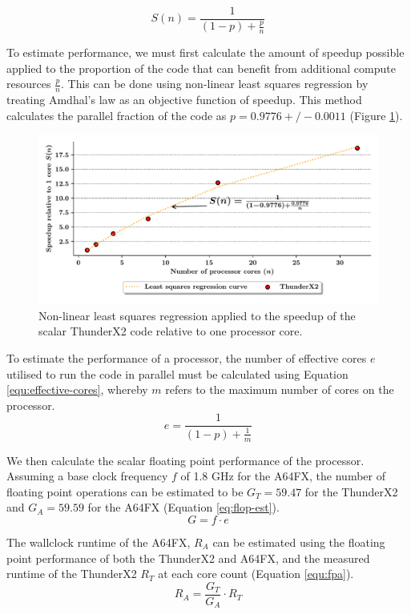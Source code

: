 \documentclass[a4paper,11pt]{report}
\begin{document}
\begin{equation}
	S(n) = \frac{1}{(1-p) + \frac{p}{n}}
	\label{equ:amdahl}
\end{equation}

To estimate performance, we must first calculate the amount of speedup possible applied to the proportion of the code that can benefit from additional compute resources $\frac{p}{n}$. This can be done using non-linear least squares regression by treating Amdhal's law as an objective function of speedup. This method calculates the parallel fraction of the code as $p = 0.9776 +/- 0.0011$ (Figure \ref{fig:least-squares}).
\par
\begin{figure}[htbp]
\begin{center}
\includegraphics[width=\textwidth]{img/a64fx-estimate.pdf}
\caption[Non-linear least squares regression ]{Non-linear least squares regression applied to the speedup of the scalar ThunderX2 code relative to one processor core.}
\label{fig:least-squares}
\end{center}
\end{figure}

\par
To estimate the performance of a processor, the number of effective cores $e$ utilised to run the code in parallel must be calculated using Equation \ref{equ:effective-cores}, whereby $m$ refers to the maximum number of cores on the processor.
\begin{equation}
e = \frac{1}{(1-p) + \frac{1}{m}}
\label{equ:effective-cores}
\end{equation}
\par
We then calculate the scalar floating point performance of the processor. Assuming a base clock frequency $f$ of 1.8 GHz for the A64FX, the number of floating point operations can be estimated to be $G_{T} = 59.47$ for the ThunderX2 and $G_{A} = 59.59$ for the A64FX (Equation \ref{eq:flop-est}).
\begin{equation}
G = f \cdot e
\label{eq:flop-est}
\end{equation}
\par
The wallclock runtime of the A64FX, $R_{A}$ can be estimated using the floating point performance of both the ThunderX2 and A64FX, and the measured runtime of the ThunderX2 $R_T$ at each core count (Equation \ref{equ:fpa}).
\begin{equation}
R_{A} = \frac{G_{T}}{G_{A}} \cdot R_{T}
\label{equ:fpa}
\end{equation}
\end{document}

